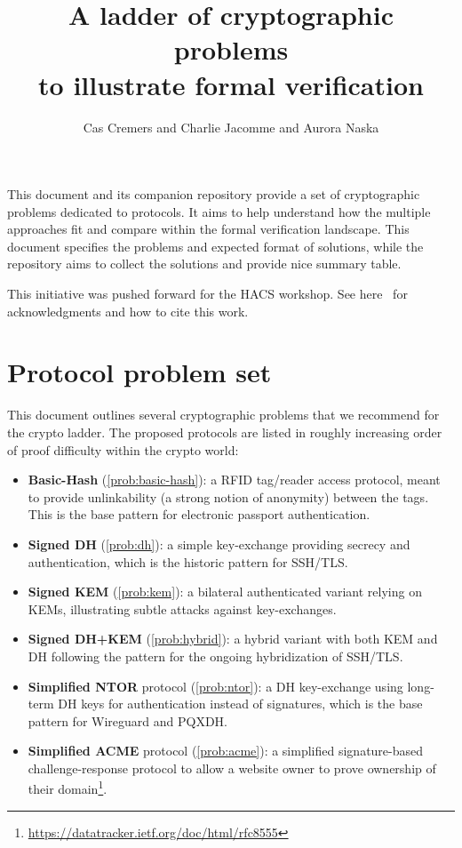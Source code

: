 \documentclass[11pt]{article}
\title{A ladder of cryptographic problems\\
to illustrate formal verification}
\author{Cas Cremers and Charlie Jacomme and Aurora Naska}
\begin{document}
\maketitle

This document and its companion repository\cite{ladder-repo} provide a set of cryptographic problems dedicated to protocols. It aims to help understand how the multiple approaches fit and compare within the formal verification landscape. This document specifies the problems and expected format of solutions, while the repository aims to collect the solutions and provide nice summary table.

This initiative was pushed forward for the HACS workshop. See here~\cite{ladder-repo-authors} for acknowledgments and how to cite this work.

\section{Protocol problem set}
This document outlines several cryptographic problems that we recommend for the crypto ladder.
The proposed protocols are listed in roughly increasing order of proof difficulty within the crypto world:
\begin{itemize}
\item \textbf{Basic-Hash} (\cref{prob:basic-hash}): a RFID tag/reader access protocol, meant to provide unlinkability (a strong notion of anonymity) between the tags. This is the base pattern for electronic passport authentication.
\item \textbf{Signed DH} (\cref{prob:dh}): a simple key-exchange providing secrecy and authentication, which is the historic pattern for SSH/TLS.
\item \textbf{Signed KEM} (\cref{prob:kem}): a bilateral authenticated variant relying on KEMs, illustrating subtle attacks against key-exchanges. 
\item  \textbf{Signed DH+KEM} (\cref{prob:hybrid}): a hybrid variant with both KEM and DH following the pattern for the ongoing hybridization of SSH/TLS.
\item \textbf{Simplified NTOR} protocol (\cref{prob:ntor}): a DH key-exchange using long-term DH keys for authentication instead of signatures, which is the base pattern for Wireguard and PQXDH.
\item \textbf{Simplified ACME} protocol (\cref{prob:acme}): a simplified signature-based challenge-response protocol to allow a website owner to prove ownership of their domain\footnote{\url{https://datatracker.ietf.org/doc/html/rfc8555}}.
\end{itemize}
\end{document}
